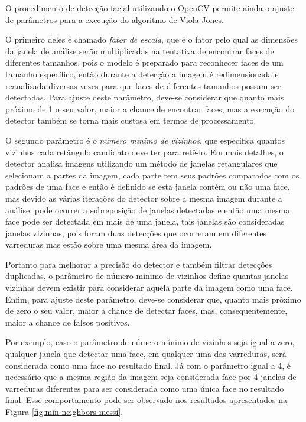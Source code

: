 O procedimento de detecção facial utilizando o OpenCV permite ainda o ajuste de parâmetros para a execução do algoritmo de Viola-Jones.

O primeiro deles é chamado \textit{fator de escala}, que é o fator pelo qual as dimensões da janela de análise serão multiplicadas na tentativa de encontrar faces de diferentes tamanhos, pois o modelo é preparado para reconhecer faces de um tamanho específico, então durante a detecção a imagem é redimensionada e reanalisada diversas vezes para que faces de diferentes tamanhos possam ser detectadas. Para ajuste deste parâmetro, deve-se considerar que quanto mais próximo de 1 o seu valor, maior a chance de encontrar faces, mas a execução do detector também se torna mais custosa em termos de processamento.

O segundo parâmetro é o \textit{número mínimo de vizinhos}, que especifica quantos vizinhos cada retângulo candidato deve ter para retê-lo. Em mais detalhes, o detector analisa imagens utilizando um método de janelas retangulares que selecionam a partes da imagem, cada parte tem seus padrões comparados com os padrões de uma face e então é definido se esta janela contém ou não uma face, mas devido as várias iterações do detector sobre a mesma imagem durante a análise, pode ocorrer a sobreposição de janelas detectadas e então uma mesma face pode ser detectada em mais de uma janela, tais janelas são consideradas janelas vizinhas, pois foram duas detecções que ocorreram em diferentes varreduras mas estão sobre uma mesma área da imagem.

Portanto para melhorar a precisão do detector e também filtrar detecções duplicadas, o parâmetro de número mínimo de vizinhos define quantas janelas vizinhas devem existir para considerar aquela parte da imagem como uma face. Enfim, para ajuste deste parâmetro, deve-se considerar que, quanto mais próximo de zero o seu valor, maior a chance de detectar faces, mas, consequentemente, maior a chance de falsos positivos.

Por exemplo, caso o parâmetro de número mínimo de vizinhos seja igual a zero, qualquer janela que detectar uma face, em qualquer uma das varreduras, será considerada como uma face no resultado final. Já com o parâmetro igual a 4, é necessário que a mesma região da imagem seja considerada face por 4 janelas de varreduras diferentes para ser considerada como uma única face no resultado final. Esse comportamento pode ser observado nos resultados apresentados na Figura \ref{fig:min-neighbors-messi}.

